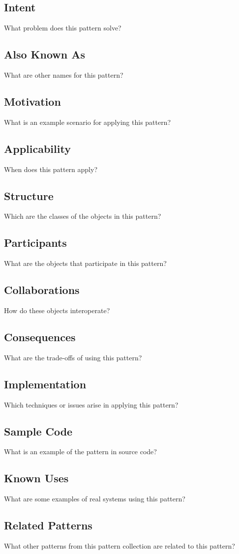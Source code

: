 \documentclass{article}
\begin{document}
\subsection{Intent}
What problem does this pattern solve?

\subsection{Also Known As}
What are other names for this pattern?

\subsection{Motivation}
What is an example scenario for applying this pattern?

\subsection{Applicability}
When does this pattern apply?

\subsection{Structure}
Which are the classes of the objects in this pattern?

\subsection{Participants}
What are the objects that participate in this pattern?

\subsection{Collaborations}
How do these objects interoperate?

\subsection{Consequences}
What are the trade-offs of using this pattern?

\subsection{Implementation}
Which techniques or issues arise in applying this pattern?

\subsection{Sample Code}
What is an example of the pattern in source code?

\subsection{Known Uses}
What are some examples of real systems using this pattern?

\subsection{Related Patterns}
What other patterns from this pattern collection are related to this pattern?
\end{document}
